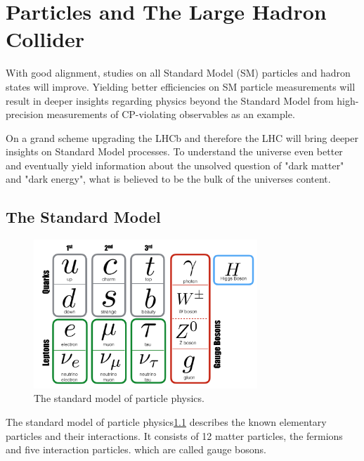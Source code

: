 \chapter{Particles and The Large Hadron Collider}
\label{sec:particleslhc}

With good alignment, studies on all Standard Model (SM) particles and hadron states
will improve. Yielding better efficiencies on SM particle measurements will
result in deeper insights regarding physics beyond the Standard Model from high-precision measurements of CP-violating observables as an example.

On a grand scheme upgrading the LHCb and therefore the LHC will bring deeper
insights on Standard Model processes. To understand the universe even better and eventually yield information about the unsolved question of "dark matter" and
"dark energy", what is believed to be the bulk of the universes content.

\section{The Standard Model}
\label{sec:sm}

\begin{figure}
  \centering
  \includegraphics[width=0.75\textwidth]{plots/SM_2018.png}
  \caption{The standard model of particle physics\cite{standard2018}.}
  \label{fig:sm2018}
\end{figure}

The standard model of particle physics\ref{fig:sm2018} describes the known elementary particles and their interactions. It consists of 12 matter particles, the fermions
and five interaction particles. which are called gauge bosons.

